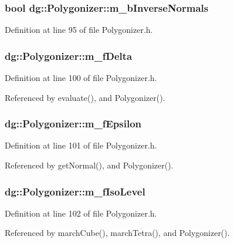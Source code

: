 \subsubsection{\setlength{\rightskip}{0pt plus 5cm}bool dg::Polygonizer::m\_\-b\-Inverse\-Normals\hspace{0.3cm}{\tt  [protected]}}\label{classdg_1_1Polygonizer_n1}




Definition at line 95 of file Polygonizer.h.
\subsubsection{ dg::Polygonizer::m\_\-f\-Delta\hspace{0.3cm}{\tt  [protected]}}\label{classdg_1_1Polygonizer_n4}




Definition at line 100 of file Polygonizer.h.

Referenced by evaluate(), and Polygonizer().
\subsubsection{ dg::Polygonizer::m\_\-f\-Epsilon\hspace{0.3cm}{\tt  [protected]}}\label{classdg_1_1Polygonizer_n5}




Definition at line 101 of file Polygonizer.h.

Referenced by get\-Normal(), and Polygonizer().
\subsubsection{ dg::Polygonizer::m\_\-f\-Iso\-Level\hspace{0.3cm}{\tt  [protected]}}\label{classdg_1_1Polygonizer_n6}




Definition at line 102 of file Polygonizer.h.

Referenced by march\-Cube(), march\-Tetra(), and Polygonizer().
